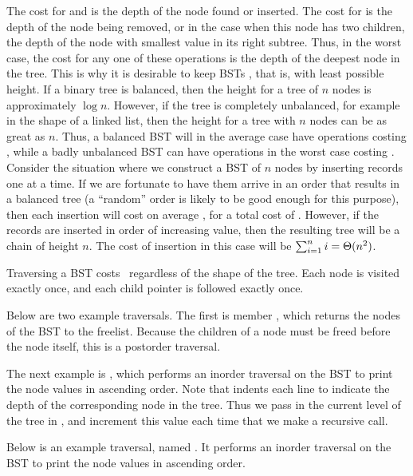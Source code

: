The cost for  and  is the depth of the
node found or inserted.
The cost for  is the depth of the node being removed,
or in the case when this node has two children,
the depth of the node with smallest value in its right subtree. 
Thus, in the worst case, the cost for any one of these operations is
the depth of the deepest node in the tree.
This is why it is desirable to keep BSTs , that is,
with least possible height.
If a binary tree is balanced, then the height for a tree of \(n\) nodes
is approximately \(\log n\).
However, if the tree is completely unbalanced, for example in the
shape of a linked list, then the height for a tree with \(n\) nodes
can be as great as \(n\).
Thus, a balanced BST will in the average case have operations costing
\Thetalogn, while a badly unbalanced BST can have operations in the
worst case costing \Thetan.
Consider the situation where we construct a BST of \(n\) nodes
by inserting records one at a time.
If we are fortunate to have them arrive in an order that results in a
balanced tree (a ``random'' order is likely to be good
enough for this purpose), then each insertion will cost on average
\Thetalogn, for a total cost of \Thetanlogn.
However, if the records are inserted in order of increasing value,
then the resulting tree will be a chain of height \(n\).
The cost of insertion in this case will be
\(\sum_{i=1}^{n} i = \mbox{$\Theta(n^2)$}\).

Traversing a BST costs \Thetan\ regardless of the shape of
the tree.
Each node is visited exactly once, and each child pointer
is followed exactly once.

{Below are two example traversals.
The first is member , which returns the nodes of the
BST to the freelist.
Because the children of a node must be freed before
the node itself, this is a postorder traversal.


The next example is , which performs an
inorder traversal on the BST to print the node values in ascending
order.
Note that  indents each line to indicate the depth of
the corresponding node in the tree.
Thus we pass in the current level of the tree in , and
increment this value each time that we make a recursive call.

}{}

{Below is an example traversal, named .
It performs an inorder traversal on the BST to print the node values
in ascending order.

}{}

